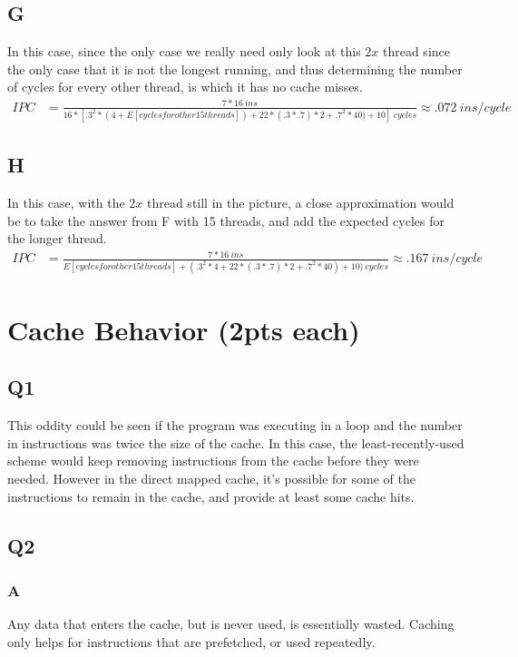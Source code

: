 \documentclass{article}
\begin{document}
\subsection{G}
In this case, since the only case we really need only look at this $2x$ thread since the only case that it is not the longest running, and thus determining the number of cycles  for every other thread, is which it has no cache misses.
\begin{eqnarray*}
IPC &= \frac{7*16~ins}{16*[.3^2*(4+E[cycles for other 15 threads])+22*(.3*.7)*2+.7^2*40) +10]~cycles} \approx .072~ins/cycle
\end{eqnarray*}

\subsection{H}
In this case, with the $2x$ thread still in the picture, a close approximation would be to take the answer from F with 15 threads, and add the expected cycles for the longer thread.
\begin{eqnarray*}
IPC &= \frac{7*16~ins}{E[cycles for other 15 threads] + (.3^2*4+22*(.3*.7)*2+.7^2*40) +10)~cycles} \approx .167~ins/cycle
\end{eqnarray*}

\section{Cache Behavior (2pts each)}
\subsection{Q1}
This oddity could be seen if the program was executing in a loop and the number in instructions was twice the size of the cache.  In this case, the least-recently-used scheme would keep removing instructions from the cache before they were needed.  However in the direct mapped cache, it's possible for some of the instructions to remain in the cache, and provide at least some cache hits.

\subsection{Q2}
\subsubsection{A}
Any data that enters the cache, but is never used, is essentially wasted.  Caching only helps for instructions that are prefetched, or used repeatedly.  
\end{document}
